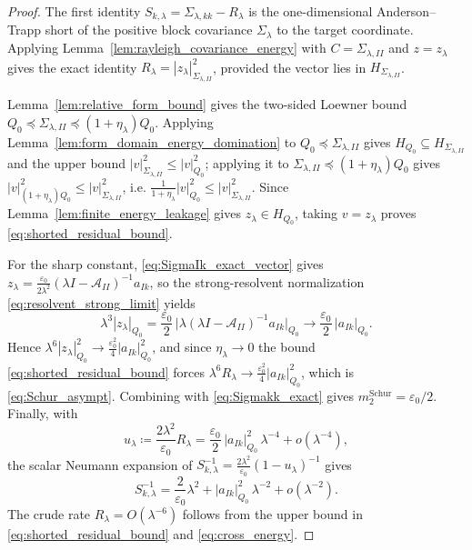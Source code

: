 \begin{proof}
The first identity $S_{k,\lambda}=\Sigma_{\lambda,kk}-R_\lambda$ is the
one-dimensional Anderson--Trapp short of the positive block covariance
$\Sigma_\lambda$ to the target coordinate.  Applying
Lemma~\ref{lem:rayleigh_covariance_energy} with
$C=\Sigma_{\lambda,II}$ and $z=z_\lambda$ gives the exact identity
$R_\lambda=|z_\lambda|_{\Sigma_{\lambda,II}}^2$, provided the vector lies in
$H_{\Sigma_{\lambda,II}}$.

Lemma~\ref{lem:relative_form_bound} gives the two-sided Loewner bound
$Q_0\preceq\Sigma_{\lambda,II}\preceq(1+\eta_\lambda)Q_0$.  Applying
Lemma~\ref{lem:form_domain_energy_domination} to $Q_0\preceq\Sigma_{\lambda,II}$
gives $H_{Q_0}\subseteq H_{\Sigma_{\lambda,II}}$ and the upper bound
$|v|_{\Sigma_{\lambda,II}}^2\le|v|_{Q_0}^2$; applying it to
$\Sigma_{\lambda,II}\preceq(1+\eta_\lambda)Q_0$ gives
$|v|_{(1+\eta_\lambda)Q_0}^2\le|v|_{\Sigma_{\lambda,II}}^2$, i.e.
$\tfrac{1}{1+\eta_\lambda}|v|_{Q_0}^2\le|v|_{\Sigma_{\lambda,II}}^2$.  Since
Lemma~\ref{lem:finite_energy_leakage} gives $z_\lambda\in H_{Q_0}$, taking
$v=z_\lambda$ proves \eqref{eq:shorted_residual_bound}.

For the sharp constant, \eqref{eq:SigmaIk_exact_vector} gives
$z_\lambda=\tfrac{\varepsilon_0}{2\lambda^2}(\lambda I-\mathcal{A}_{II})^{-1}a_{Ik}$,
so the strong-resolvent normalization \eqref{eq:resolvent_strong_limit} yields
\[
  \lambda^3|z_\lambda|_{Q_0}
  =\frac{\varepsilon_0}{2}\,
   \bigl|\lambda(\lambda I-\mathcal{A}_{II})^{-1}a_{Ik}\bigr|_{Q_0}
  \longrightarrow\frac{\varepsilon_0}{2}\,|a_{Ik}|_{Q_0}.
\]
Hence $\lambda^6|z_\lambda|_{Q_0}^2\to\tfrac{\varepsilon_0^2}{4}|a_{Ik}|_{Q_0}^2$,
and since $\eta_\lambda\to0$ the bound \eqref{eq:shorted_residual_bound} forces
$\lambda^6R_\lambda\to\tfrac{\varepsilon_0^2}{4}|a_{Ik}|_{Q_0}^2$, which is
\eqref{eq:Schur_asympt}.  Combining with \eqref{eq:Sigmakk_exact} gives
$m_2^{\mathrm{Schur}}=\varepsilon_0/2$.  Finally, with
\[
  u_\lambda\coloneqq\frac{2\lambda^2}{\varepsilon_0}R_\lambda
  =\frac{\varepsilon_0}{2}\,|a_{Ik}|_{Q_0}^2\,\lambda^{-4}+o(\lambda^{-4}),
\]
the scalar Neumann expansion of
$S_{k,\lambda}^{-1}=\tfrac{2\lambda^2}{\varepsilon_0}(1-u_\lambda)^{-1}$ gives
\[
  S_{k,\lambda}^{-1}
  =\frac{2}{\varepsilon_0}\lambda^2
   +|a_{Ik}|_{Q_0}^2\,\lambda^{-2}+o(\lambda^{-2}).
\]
The crude rate $R_\lambda=O(\lambda^{-6})$ follows from the upper bound in
\eqref{eq:shorted_residual_bound} and \eqref{eq:cross_energy}.
\end{proof}

